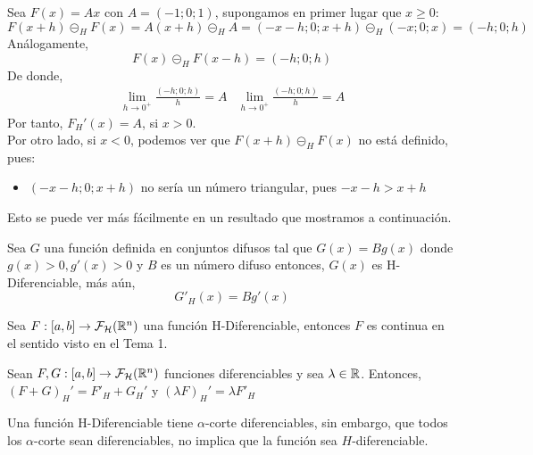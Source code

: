 \begin{ejemplo}
	\label{ejemplo:hukuhara}
	Sea $F(x)=A x$ con $A=(-1; 0; 1)$, supongamos en primer lugar que $x \geq 0$:
	\[
		F(x + h) \circleddash_H F(x) = A(x + h) \circleddash_H A = (-x - h; 0; x+h) \circleddash_H (-x; 0; x) = (-h; 0; h)
	\]
	Análogamente, 
	\[
		F(x) \circleddash_H F(x - h) = (-h; 0; h)
	\]
	De donde,
	\[
	\begin{array}{c||c}
		\lim\limits_{h \rightarrow 0^+} \frac{(-h; 0; h)}{h}=A & \lim\limits_{h \rightarrow 0^+} \frac{(-h; 0; h)}{h}=A
	\end{array}
	\]
	Por tanto, $F_H'(x) = A $, si $x > 0$. \\
	Por otro lado, si $x<0$, podemos ver que $F(x+h) \circleddash_H F(x)$ no está definido, pues:
	
	\begin{itemize}
		\item $(-x-h; 0; x+h)$ no sería un número triangular, pues $-x-h > x+h$
	\end{itemize}

	Esto se puede ver más fácilmente en un resultado que mostramos a continuación.
\end{ejemplo}

\begin{proposicion}
	Sea $G$ una función definida en conjuntos difusos tal que $G(x)=B g(x)$ donde $g(x)>0, g'(x)>0$ y $B$ es un número difuso entonces, $G(x)$ es H-Diferenciable, más aún, 
	\[
		G'_H(x) = B g'(x)
	\]
\end{proposicion}

\begin{teorema} Sea  $F: [a, b] \rightarrow \mathcal{F}_\mathcal{H}(\mathbb R^n)$ una función H-Diferenciable, entonces $F$ es continua en el sentido visto en el Tema 1.
\end{teorema}

\begin{teorema}
	Sean $F, G : [a, b] \rightarrow \mathcal{F}_\mathcal{H}(\mathbb R^n)$ funciones diferenciables y sea $\lambda \in \mathbb R$. Entonces, $(F+G)_H' = F'_H + G_H'$ y $(\lambda F)_H' = \lambda F'_H$
\end{teorema}

Una función H-Diferenciable tiene $\alpha$-corte diferenciables, sin embargo, que todos los $\alpha$-corte sean diferenciables, no implica que la función sea $H$-diferenciable.

